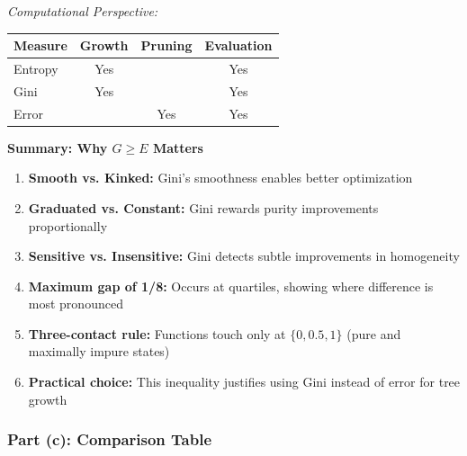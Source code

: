 \documentclass[12pt]{article}
\begin{document}
\begin{explanation}
\textit{Computational Perspective:}

\begin{center}
\begin{tabular}{l|c|c|c}
Measure & Growth & Pruning & Evaluation \\
\hline
Entropy & Yes & & Yes \\
Gini & Yes & & Yes \\
Error & & Yes & Yes \\
\end{tabular}
\end{center}

\textbf{Summary: Why $G \geq E$ Matters}

\begin{enumerate}
    \item \textbf{Smooth vs. Kinked:} Gini's smoothness enables better optimization
    \item \textbf{Graduated vs. Constant:} Gini rewards purity improvements proportionally
    \item \textbf{Sensitive vs. Insensitive:} Gini detects subtle improvements in homogeneity
    \item \textbf{Maximum gap of 1/8:} Occurs at quartiles, showing where difference is most pronounced
    \item \textbf{Three-contact rule:} Functions touch only at $\{0, 0.5, 1\}$ (pure and maximally impure states)
    \item \textbf{Practical choice:} This inequality justifies using Gini instead of error for tree growth
\end{enumerate}
\end{explanation}

\subsubsection{Part (c): Comparison Table}
\end{document}
